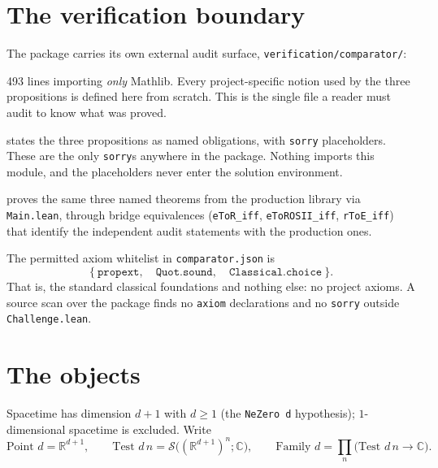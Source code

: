 \documentclass[11pt,a4paper]{article}
\newcommand{\lean}[1]{\texttt{#1}}
\begin{document}
\section{The verification boundary}

The package carries its own external audit surface, \lean{verification/comparator/}:

\begin{description}[leftmargin=2.2em,itemsep=2pt]
\item[\lean{Definitions.lean}] 493 lines importing \emph{only} Mathlib. Every
project-specific notion used by the three propositions is defined here from
scratch. This is the single file a reader must audit to know what was proved.
\item[\lean{Challenge.lean}] states the three propositions as named obligations,
with \lean{sorry} placeholders. These are the only \lean{sorry}s anywhere in the
package. Nothing imports this module, and the placeholders never enter the
solution environment.
\item[\lean{Solution.lean}] proves the same three named theorems from the
production library via \lean{Main.lean}, through bridge equivalences
(\lean{eToR\_iff}, \lean{eToROSII\_iff}, \lean{rToE\_iff}) that identify the
independent audit statements with the production ones.
\end{description}

The permitted axiom whitelist in \lean{comparator.json} is
\[
  \{\ \lean{propext},\quad \lean{Quot.sound},\quad \lean{Classical.choice}\ \}.
\]
That is, the standard classical foundations and nothing else: no project axioms.
A source scan over the package finds no \lean{axiom} declarations and no
\lean{sorry} outside \lean{Challenge.lean}.

\section{The objects}

Spacetime has dimension $d+1$ with $d \ge 1$ (the \lean{NeZero d} hypothesis);
$1$-dimensional spacetime is excluded. Write
\[
  \text{Point } d = \mathbb{R}^{d+1}, \qquad
  \text{Test } d\, n = \mathcal{S}\big((\mathbb{R}^{d+1})^{n};\mathbb{C}\big), \qquad
  \text{Family } d = \textstyle\prod_{n} \big(\text{Test } d\, n \to \mathbb{C}\big).
\]
\end{document}
